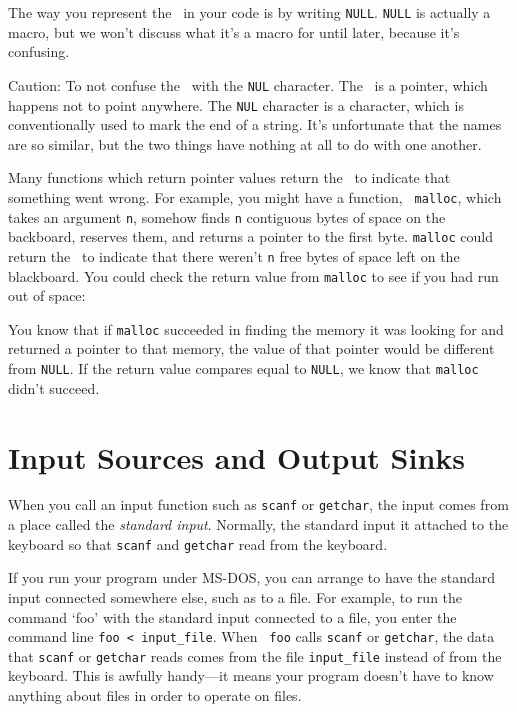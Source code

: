 The way you represent the \np\ in your code is by writing {\tt NULL}.
{\tt NULL} is actually a macro, but we won't discuss what it's a macro
for until later, because it's confusing.

Caution:  To not confuse the \np\ with the {\tt NUL} character.  The
\np\ is a pointer, which happens not to point anywhere.  The {\tt NUL}
character is a character, which is conventionally used to mark the end
of a string.  It's unfortunate that the names are so similar, but the
two things have nothing at all to do with one another.

Many functions which return pointer values return the \np\ to indicate
that something went wrong.  For example, you might have a function, {\tt
malloc}, which takes an argument {\tt n}, somehow finds {\tt n}
contiguous bytes of space on the backboard, reserves them, and returns a
pointer to the first byte.  {\tt malloc} could return the \np\ to
indicate that there weren't {\tt n} free bytes of space left on the
blackboard.  You could check the return value from {\tt malloc} to see
if you had run out of space:  
\begin{flushleft}
\verb% char *buf;% \\*
\verb% buf = malloc(1000);% \\*
\verb% if (buf == NULL) {% \\*
\verb%   printf("Out of memory.\n"); % \\*
\verb%   abort();% \\*
\verb% }% \\*
\verb% . . . %
\end{flushleft}

You know that if {\tt malloc} succeeded in finding the memory it was
looking for and returned a pointer to that memory, the value of that
pointer would be different from {\tt NULL}.  If the return value
compares equal to {\tt NULL}, we know that {\tt malloc} didn't succeed.

\section{Input Sources and Output Sinks}

When you call an input function such as {\tt scanf} or {\tt getchar},
the input comes from a place called the {\em standard input}.  Normally,
the standard input it attached to the keyboard so that {\tt scanf} and
{\tt getchar} read from the keyboard.  

If you run your program under MS-DOS, you can arrange to have the
standard input connected somewhere else, such as to a file.  For
example, to run the command `foo' with the standard input connected to a
file, you enter the command line {\tt foo < input\_file}.  When {\tt
foo} calls {\tt scanf} or {\tt getchar}, the data that {\tt scanf} or
{\tt getchar} reads comes from the file {\tt input\_file} instead of
from the keyboard.  This is awfully handy---it means your program
doesn't have to know anything about files in order to operate on files.

